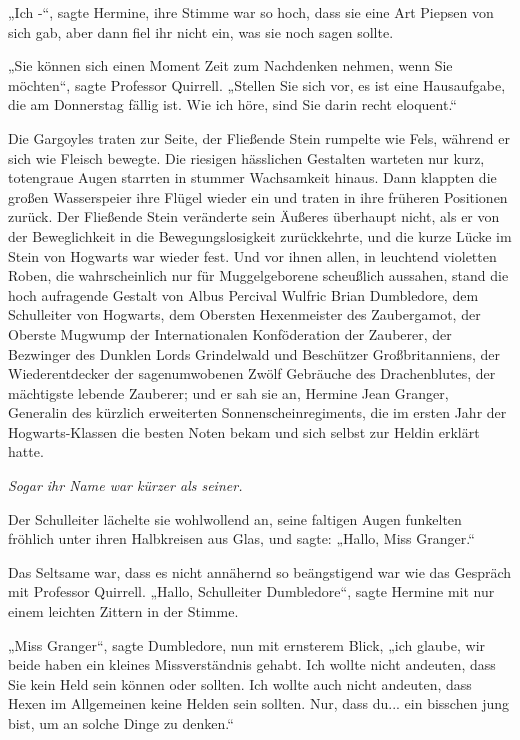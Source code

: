 {„Ich -“, sagte Hermine, ihre Stimme war so hoch, dass sie eine Art Piepsen von sich gab, aber dann fiel ihr nicht ein, was sie noch sagen sollte.

„Sie können sich einen Moment Zeit zum Nachdenken nehmen, wenn Sie möchten“, sagte Professor Quirrell. „Stellen Sie sich vor, es ist eine Hausaufgabe, die am Donnerstag fällig ist. Wie ich höre, sind Sie darin recht eloquent.“

Die Gargoyles traten zur Seite, der Fließende Stein rumpelte wie Fels, während er sich wie Fleisch bewegte. Die riesigen hässlichen Gestalten warteten nur kurz, totengraue Augen starrten in stummer Wachsamkeit hinaus. Dann klappten die großen Wasserspeier ihre Flügel wieder ein und traten in ihre früheren Positionen zurück. Der Fließende Stein veränderte sein Äußeres überhaupt nicht, als er von der Beweglichkeit in die Bewegungslosigkeit zurückkehrte, und die kurze Lücke im Stein von Hogwarts war wieder fest. Und vor ihnen allen, in leuchtend violetten Roben, die wahrscheinlich nur für Muggelgeborene scheußlich aussahen, stand die hoch aufragende Gestalt von Albus Percival Wulfric Brian Dumbledore, dem Schulleiter von Hogwarts, dem Obersten Hexenmeister des Zaubergamot, der Oberste Mugwump der Internationalen Konföderation der Zauberer, der Bezwinger des Dunklen Lords Grindelwald und Beschützer Großbritanniens, der Wiederentdecker der sagenumwobenen Zwölf Gebräuche des Drachenblutes, der mächtigste lebende Zauberer; und er sah sie an, Hermine Jean Granger, Generalin des kürzlich erweiterten Sonnenscheinregiments, die im ersten Jahr der Hogwarts-Klassen die besten Noten bekam und sich selbst zur Heldin erklärt hatte.

\emph{Sogar ihr Name war kürzer als seiner.}

Der Schulleiter lächelte sie wohlwollend an, seine faltigen Augen funkelten fröhlich unter ihren Halbkreisen aus Glas, und sagte: „Hallo, Miss Granger.“

Das Seltsame war, dass es nicht annähernd so beängstigend war wie das Gespräch mit Professor Quirrell. „Hallo, Schulleiter Dumbledore“, sagte Hermine mit nur einem leichten Zittern in der Stimme.

„Miss Granger“, sagte Dumbledore, nun mit ernsterem Blick, „ich glaube, wir beide haben ein kleines Missverständnis gehabt. Ich wollte nicht andeuten, dass Sie kein Held sein können oder sollten. Ich wollte auch nicht andeuten, dass Hexen im Allgemeinen keine Helden sein sollten. Nur, dass du... ein bisschen jung bist, um an solche Dinge zu denken.“

}
